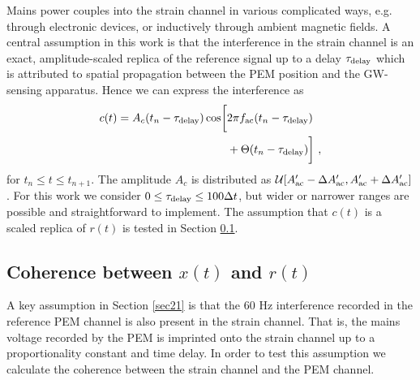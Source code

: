 \documentclass[pra,superscriptaddress,reprint,amsmath,amssymb,nofootinbib]{revtex4-2}
\begin{document}
Mains power couples into the strain channel in various complicated ways, e.g. through electronic devices, or inductively through ambient magnetic fields. A central assumption in this work is that the interference in the strain channel is an exact, amplitude-scaled replica of the reference signal up to a delay $\tau_{\rm delay}$ which is attributed to spatial propagation between the PEM position and the GW-sensing apparatus. Hence we can express the interference as 
 \begin{align}
	c(t) = A_c(t_n - \tau_{\rm delay}) \cos \biggl [ & 2 \pi f_{\rm ac} (t_n - \tau_{\rm delay}) \nonumber \\ 
	&+ \Theta(t_n - \tau_{\rm delay}	) \biggr ] \ ,
	\label{eq:vclutter}
\end{align}
for $t_n \leq t \leq t_{n+1}$. The amplitude $A_c$ is distributed as $\mathcal{U}[A'_{\rm ac}- \Delta A'_{\rm ac} ,A'_{\rm ac} + \Delta A'_{\rm ac} ]$. For this work we consider $0 \leq \tau_{\rm delay} \leq 100 \Delta t$, but wider or narrower ranges are possible and straightforward to implement. The assumption that $c(t)$ is a scaled replica of $r(t)$ is tested in Section \ref{sec23}.




\subsection{Coherence between $x(t)$ and $r(t)$}  \label{sec23}
A key assumption in Section \ref{sec21} is that the 60 Hz interference recorded in the reference PEM channel is also present in the strain channel. That is, the mains voltage recorded by the PEM is imprinted onto the strain channel up to a proportionality constant and time delay. In order to test this assumption we calculate the coherence between the strain channel and the PEM channel. \newline 
\end{document}
